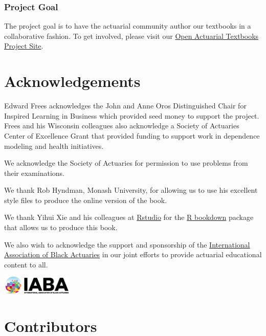 \documentclass[]{book}
\theoremstyle{definition}
\theoremstyle{definition}
\theoremstyle{definition}
\theoremstyle{remark}
\begin{document}
\subsubsection*{Project Goal}\label{project-goal}

The project goal is to have the actuarial community author our textbooks
in a collaborative fashion. To get involved, please visit our
\href{https://sites.google.com/a/wisc.edu/loss-data-analytics/}{Open
Actuarial Textbooks Project Site}.

\section*{Acknowledgements}\label{acknowledgements}

Edward Frees acknowledges the John and Anne Oros Distinguished Chair for
Inspired Learning in Business which provided seed money to support the
project. Frees and his Wisconsin colleagues also acknowledge a Society
of Actuaries Center of Excellence Grant that provided funding to support
work in dependence modeling and health initiatives.

We acknowledge the Society of Actuaries for permission to use problems
from their examinations.

We thank Rob Hyndman, Monash University, for allowing us to use his
excellent style files to produce the online version of the book.

We thank Yihui Xie and his colleagues at
\href{https://www.rstudio.com/}{Rstudio} for the
\href{https://bookdown.org/yihui/bookdown/}{R bookdown} package that
allows us to produce this book.

We also wish to acknowledge the support and sponsorship of the
\href{http://www.blackactuaries.org/}{International Association of Black
Actuaries} in our joint efforts to provide actuarial educational content
to all.

\includegraphics[width=0.25000\textwidth]{Figures/IABA.png}

\section*{Contributors}\label{contributors}
\end{document}
